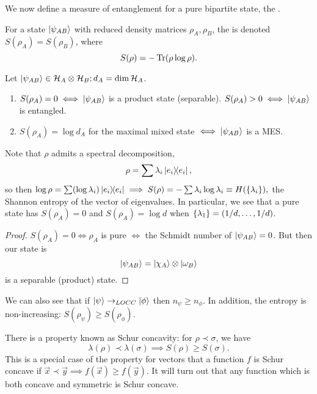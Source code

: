 We now define a measure of entanglement for a pure bipartite state, the .
\begin{defn}
    For a state $\lvert\psi_{AB}\rangle$ with reduced density matrices $\rho_A,\rho_B$, the  is denoted $S(\rho_A)=S(\rho_B)$, where
    \begin{equation}
         S(\rho)=-\operatorname{Tr}(\rho\log \rho).
    \end{equation}
\end{defn}
\begin{thm}
    Let $\lvert\psi_{AB}\rangle\in \mathcal H_A \otimes \mathcal H_B; d_A =\dim \mathcal H_A$.
    \begin{enumerate}
        \item $S(\rho_A)=0 \iff \lvert\psi_{AB}\rangle$ is a product state (separable). $S(\rho_A) >0 \iff \lvert\psi_{AB}\rangle$ is entangled.
        \item $S(\rho_A) = \log d_A$ for the maximal mixed state $\iff \lvert\psi_{AB}\rangle$ is a MES.
    \end{enumerate}
\end{thm}
Note that $\rho$ admits a spectral decomposition,
\begin{equation}
    \rho=\sum \lambda_i \left\lvert{e_i}\middle\rangle\!\middle\langle{e_i}\right\rvert,
\end{equation}
so then $\log\rho=\sum(\log\lambda_i) \left\lvert{e_i}\middle\rangle\!\middle\langle{e_i}\right\rvert \implies S(\rho)=-\sum \lambda_i \log \lambda_i \equiv H(\{\lambda_i\}),$
the Shannon entropy of the vector of eigenvalues. In particular, we see that a pure state has $S(\rho_A)=0$ and $S(\rho_A)=\log d$ when $\{\lambda_1\}=(1/d,\ldots,1/d)$.

\begin{proof}
    $S(\rho_A)=0 \iff \rho_A$ is pure $\iff$ the Schmidt number of $\lvert\psi_{AB}\rangle=0$. But then our state is
    \begin{equation}
        \lvert\psi_{AB}\rangle=\lvert\chi_A\rangle\otimes \lvert\omega_B\rangle
    \end{equation}
    is a separable (product) state.
\end{proof}
We can also see that if $\lvert\psi\rangle\to_{LOCC}\lvert\phi\rangle$ then $n_\psi \geq n_\phi.$ In addition, the entropy is non-increasing: $S(\rho_\psi)\geq S(\rho_\phi)$.

There is a property known as Schur concavity: for $\rho \prec \sigma$, we have
\begin{equation}
    \lambda(\rho)\prec \lambda(\sigma) \implies S(\rho)\geq S(\sigma).
\end{equation}
This is a special case of the property for vectors that a function $f$ is Schur concave if $\vec x \prec \vec y \implies f(\vec x) \geq f(\vec y)$. It will turn out that any function which is both concave and symmetric is Schur concave.

